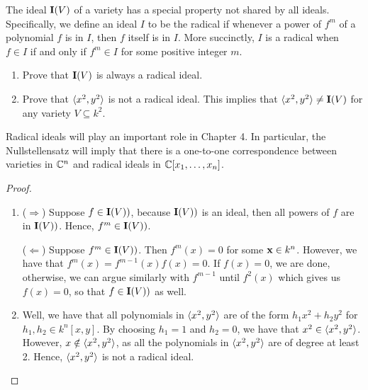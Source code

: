 \begin{exercise}{8}
The ideal $\mathbf{I}(V)$ of a variety has a special property not shared by all ideals. Specifically, we define an ideal $I$ to be the radical if whenever a power of $f^m$ of a polynomial $f$ is in $I$, then $f$ itself is in $I$. More succinctly, $I$ is a radical when $f\in I$ if and only if $f^m\in I$ for some positive integer $m$.
\begin{enumerate}
    \item Prove that $\mathbf{I}(V)$ is always a radical ideal.
    \item Prove that $\langle x^2,y^2\rangle$ is not a radical ideal. This implies that $\langle x^2,y^2\rangle\neq \mathbf{I}(V)$ for any variety $V\subseteq k^2$.
\end{enumerate}
Radical ideals will play an important role in Chapter 4. In particular, the Nullstellensatz will imply that there is a one-to-one correspondence between varieties in $\mathbb{C}^n$ and radical ideals in $\mathbb{C}[x_1,\dots,x_n]$.
\end{exercise}
\begin{proof}
\begin{enumerate}
    \item ($\Rightarrow$) Suppose $f\in\mathbf{I}(V))$, because $\mathbf{I}(V))$ is an ideal, then all powers of $f$ are in $\mathbf{I}(V))$. Hence, $f^m\in\mathbf{I}(V))$.

    ($\Leftarrow$) Suppose $f^m\in\mathbf{I}(V))$. Then $f^m(x)=0$ for some $\mathbf{x}\in k^n$. However, we have that $f^m(x) =f^{m-1}(x)f(x)=0$. If $f(x)=0$, we are done, otherwise, we can argue similarly with $f^{m-1}$ until $f^2(x)$ which gives us $f(x)=0$, so that $f\in\mathbf{I}(V))$ as well.
    \item Well, we have that all polynomials in $\langle x^2,y^2\rangle$ are of the form $h_1x^2+h_2y^2$ for $h_1,h_2\in k^n[x,y]$. By choosing $h_1=1$ and $h_2=0$, we have that $x^2\in\langle x^2,y^2\rangle$. However, $x\notin\langle x^2,y^2\rangle$, as all the polynomials in $\langle x^2,y^2\rangle$ are of degree at least 2. Hence, $\langle x^2,y^2\rangle$ is not a radical ideal.
\end{enumerate}
\end{proof}


